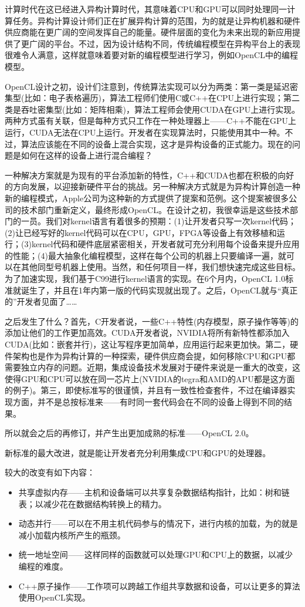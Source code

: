 计算时代在这已经进入异构计算时代，其意味着CPU和GPU可以同时处理同一计算任务。异构计算设计师们正在扩展异构计算的范围，为的就是让异构机器和硬件供应商能在更广阔的空间发挥自己的能量。硬件层面的变化为未来出现的新应用提供了更广阔的平台。不过，因为设计结构不同，传统编程模型在异构平台上的表现很难令人满意，这样就意味着要对新的编程模型进行学习，例如OpenCL中的编程模型。

OpenCL设计之初，设计们注意到，传统算法实现可以分为两类：第一类是延迟密集型(比如：电子表格遍历)，算法工程师们使用C或C++在CPU上进行实现；第二类是吞吐密集型(比如：矩阵相乘)，算法工程师会使用CUDA在GPU上进行实现。两种方式虽有关联，但是每种方式只工作在一种处理器上——C++不能在GPU上运行，CUDA无法在CPU上运行。开发者在实现算法时，只能使用其中一种。不过，算法应该能在不同的设备上混合实现，这才是异构设备的正式能力。现在的问题是如何在这样的设备上进行混合编程？

一种解决方案就是为现有的平台添加新的特性，C++和CUDA也都在积极的向好的方向发展，以迎接新硬件平台的挑战。另一种解决方式就是为异构计算创造一种新的编程模式，Apple公司为这种新的方式提供了提案和范例。这个提案被很多公司的技术部门重新定义，最终形成OpenCL。在设计之初，我很幸运是这些技术部门的一员。我们对kernel语言有着很多的预期：(1)让开发者只写一次kernel代码；(2)让已经写好的kernel代码可以在CPU，GPU，FPGA等设备上有效移植和运行；(3)kernel代码和硬件底层紧密相关，开发者就可充分利用每个设备来提升应用的性能；(4)最大抽象化编程模型，这样在每个公司的机器上只要编译一遍，就可以在其他同型号机器上使用。当然，和任何项目一样，我们想快速完成这些目标。为了加速实现，我们基于C99进行kernel语言的实现。在6个月内，OpenCL 1.0标准就诞生了，并且在1年内第一版的代码实现就出现了。之后，OpenCL就与“真正的”开发者见面了……

之后发生了什么？首先，C开发者说，一些C++特性(内存模型，原子操作等等)的添加让他们的工作更加高效。CUDA开发者说，NVIDIA将所有新特性都添加入CUDA(比如：嵌套并行)，这让写程序更加简单，应用运行起来更加快。第二，硬件架构也是作为异构计算的一种探索，硬件供应商会提，如何移除CPU和GPU都需要独立内存的问题。近期，集成设备技术发展对于硬件来说是一重大的改变，这使得GPU和CPU可以放在同一芯片上(NVIDIA的tegra和AMD的APU都是这方面的例子)。第三，即使标准写的很谨慎，并且有一致性检查套件，不过在编译器实现方面，并不是总按标准来——有时同一套代码会在不同的设备上得到不同的结果。

所以就会之后的再修订，并产生出更加成熟的标准——OpenCL 2.0。

新标准的最大改进，就是能让开发者充分利用集成CPU和GPU的处理器。

较大的改变有如下内容：

\begin{itemize}
\item 共享虚拟内存——主机和设备端可以共享复杂数据结构指针，比如：树和链表；以减少花在数据结构转换上的精力。
\item 动态并行——可以在不用主机代码参与的情况下，进行内核的加载，为的就是减小加载内核所产生的瓶颈。
\item 统一地址空间——这样同样的函数就可以处理GPU和CPU上的数据，以减少编程的难度。
\item C++原子操作——工作项可以跨越工作组共享数据和设备，可以让更多的算法使用OpenCL实现。
\end{itemize}

